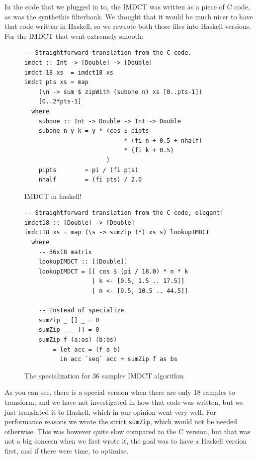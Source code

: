 \documentclass[a4paper,12pt]{article}
\begin{document}
        In the code that we plugged in to, the IMDCT was written as a piece of C
        code, as was the synthethis filterbank. We thought that it would be much
        nicer to have that code written in Haskell, so we rewrote both those
        files into Haskell versions. For the IMDCT that went extremely
        smooth:
\begin{figure}[h]
  \begin{center}
        \begin{lstlisting}
-- Straightforward translation from the C code.
imdct :: Int -> [Double] -> [Double]
imdct 18 xs  = imdct18 xs
imdct pts xs = map
    (\n -> sum $ zipWith (subone n) xs [0..pts-1])
    [0..2*pts-1]
  where
    subone :: Int -> Double -> Int -> Double
    subone n y k = y * (cos $ pipts
                            * (fi n + 0.5 + nhalf)
                            * (fi k + 0.5)
                       )
    pipts        = pi / (fi pts)
    nhalf        = (fi pts) / 2.0
        \end{lstlisting}
    \caption{IMDCT in haskell!}\label{fig:imdcthaskell}
  \end{center}
\end{figure}

\begin{figure}[h]
  \begin{center}
        \begin{lstlisting}
-- Straightforward translation from the C code, elegant!
imdct18 :: [Double] -> [Double]
imdct18 xs = map (\s -> sumZip (*) xs s) lookupIMDCT
  where
    -- 36x18 matrix
    lookupIMDCT :: [[Double]]
    lookupIMDCT = [[ cos $ (pi / 18.0) * n * k
                   | k <- [0.5, 1.5 .. 17.5]]
                   | n <- [9.5, 10.5 .. 44.5]]

    -- Instead of specialize
    sumZip _ [] _ = 0
    sumZip _ _ [] = 0
    sumZip f (a:as) (b:bs)
        = let acc = (f a b)
          in acc `seq` acc + sumZip f as bs
        \end{lstlisting}
    \caption{The specialization for 36 samples IMDCT algorithm}\label{fig:imdctimpl36}
  \end{center}
\end{figure}

        As you can see, there is a special version when there are only 18
        samples to transform, and we have not investigated in how that code was
        written, but we just translated it to Haskell, which in our opinion went
        very well. For performance reasons we wrote the strict \texttt{sumZip}, which would
        not be needed otherwise. This was however quite slow compared to the C
        version, but that was not a big concern when we first wrote it, the goal
        was to have a Haskell version first, and if there were time, to
        optimise. \\
\end{document}
